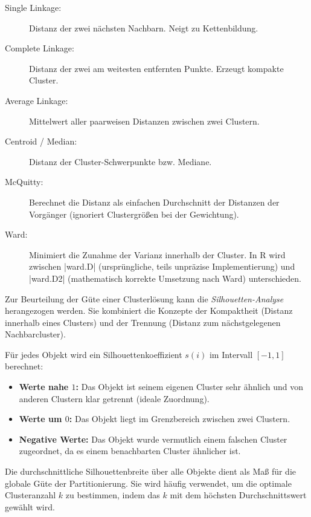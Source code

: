 \documentclass[10pt,twocolumn]{scrartcl}
\renewcommand{\lstinline}{\mycoloredinline}
\begin{document}
\begin{description}
\item[Single Linkage:] Distanz der zwei nächsten Nachbarn. Neigt zu Kettenbildung.
\item[Complete Linkage:] Distanz der zwei am weitesten entfernten Punkte. Erzeugt kompakte Cluster.
\item[Average Linkage:] Mittelwert aller paarweisen Distanzen zwischen zwei Clustern.
\item[Centroid / Median:] Distanz der Cluster-Schwerpunkte bzw. Mediane.
\item[McQuitty:] Berechnet die Distanz als einfachen Durchschnitt der Distanzen der Vorgänger (ignoriert Clustergrößen bei der Gewichtung).
\item[Ward:] Minimiert die Zunahme der Varianz innerhalb der Cluster. In R wird zwischen \lstinline|ward.D| (ursprüngliche, teils unpräzise Implementierung) und \lstinline|ward.D2| (mathematisch korrekte Umsetzung nach Ward) unterschieden.
\end{description}

Zur Beurteilung der Güte einer Clusterlösung kann die \emph{Silhouetten-Analyse} herangezogen werden. Sie kombiniert die Konzepte der Kompaktheit (Distanz innerhalb eines Clusters) und der Trennung (Distanz zum nächstgelegenen Nachbarcluster).

Für jedes Objekt wird ein Silhouettenkoeffizient $s(i)$ im Intervall $[-1, 1]$ berechnet:
\begin{itemize}
\item \textbf{Werte nahe $1$:} Das Objekt ist seinem eigenen Cluster sehr ähnlich und von anderen Clustern klar getrennt (ideale Zuordnung).
\item \textbf{Werte um $0$:} Das Objekt liegt im Grenzbereich zwischen zwei Clustern.
\item \textbf{Negative Werte:} Das Objekt wurde vermutlich einem falschen Cluster zugeordnet, da es einem benachbarten Cluster ähnlicher ist.
\end{itemize}

Die durchschnittliche Silhouettenbreite über alle Objekte dient als Maß für die globale Güte der Partitionierung. Sie wird häufig verwendet, um die optimale Clusteranzahl $k$ zu bestimmen, indem das $k$ mit dem höchsten Durchschnittswert gewählt wird.
\end{document}
